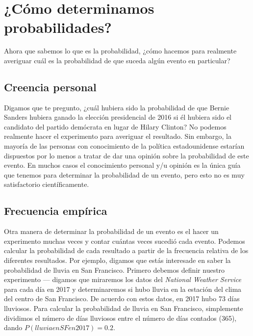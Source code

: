 \documentclass[
  12pt,
]{book}
\begin{document}
\hypertarget{cuxf3mo-determinamos-probabilidades}{%
\section{¿Cómo determinamos probabilidades?}\label{cuxf3mo-determinamos-probabilidades}}

Ahora que sabemos lo que es la probabilidad, ¿cómo hacemos para realmente averiguar cuál es la probabilidad de que suceda algún evento en particular?

\hypertarget{creencia-personal}{%
\subsection{Creencia personal}\label{creencia-personal}}

Digamos que te pregunto, ¿cuál hubiera sido la probabilidad de que Bernie Sanders hubiera ganado la elección presidencial de 2016 si él hubiera sido el candidato del partido demócrata en lugar de Hilary Clinton? No podemos realmente hacer el experimento para averiguar el resultado. Sin embargo, la mayoría de las personas con conocimiento de la política estadounidense estarían dispuestos por lo menos a tratar de dar una opinión sobre la probabilidad de este evento. En muchos casos el conocimiento personal y/u opinión es la única guía que tenemos para determinar la probabilidad de un evento, pero esto no es muy satisfactorio científicamente.

\hypertarget{empirical-frequency}{%
\subsection{Frecuencia empírica}\label{empirical-frequency}}

Otra manera de determinar la probabilidad de un evento es el hacer un experimento muchas veces y contar cuántas veces sucedió cada evento. Podemos calcular la probabilidad de cada resultado a partir de la frecuencia relativa de los diferentes resultados. Por ejemplo, digamos que estás interesade en saber la probabilidad de lluvia en San Francisco. Primero debemos definir nuestro experimento --- digamos que miraremos los datos del \emph{National Weather Service} para cada día en 2017 y determinaremos si hubo lluvia en la estación del clima del centro de San Francisco. De acuerdo con estos datos, en 2017 hubo 73 días lluviosos. Para calcular la probabilidad de lluvia en San Francisco, simplemente dividimos el número de días lluviosos entre el número de días contados (365), dando \(P(lluvia en SF en 2017) = 0.2\).
\end{document}
